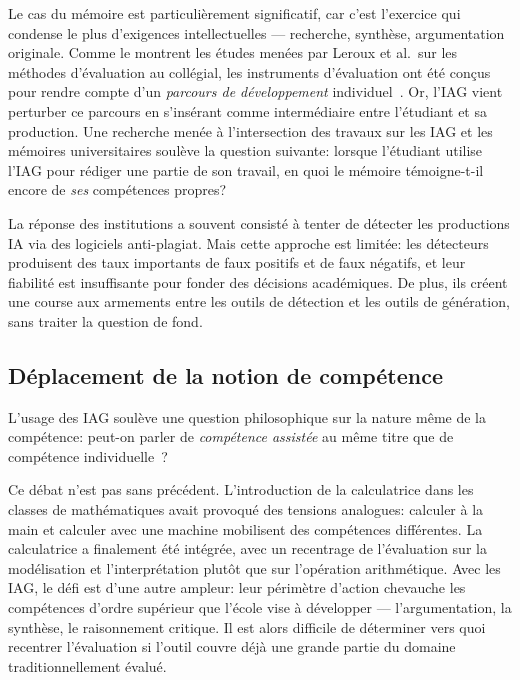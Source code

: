 Le cas du m\'emoire est particuli\`erement significatif, car c'est l'exercice qui condense le plus d'exigences intellectuelles --- recherche, synth\`ese, argumentation originale. 
Comme le montrent les \'etudes men\'ees par Leroux et al.\ sur les m\'ethodes d'\'evaluation au coll\'egial, les instruments d'\'evaluation ont \'et\'e con\c{c}us pour rendre compte d'un \emph{parcours de d\'eveloppement} individuel~\cite{leroux2022}.
Or, l'IAG vient perturber ce parcours en s'ins\'erant comme interm\'ediaire entre l'\'etudiant et sa production. 
Une recherche men\'ee \`a l'intersection des travaux sur les IAG et les m\'emoires universitaires soul\`eve la question suivante: lorsque l'\'etudiant utilise l'IAG pour r\'ediger une partie de son travail, en quoi le m\'emoire t\'emoigne-t-il encore de \emph{ses} comp\'etences propres?

La r\'eponse des institutions a souvent consist\'e \`a tenter de d\'etecter les productions IA via des logiciels anti-plagiat. 
Mais cette approche est limit\'ee: les d\'etecteurs produisent des taux importants de faux positifs et de faux n\'egatifs, et leur fiabilit\'e est insuffisante pour fonder des d\'ecisions acad\'emiques. 
De plus, ils cr\'eent une course aux armements entre les outils de d\'etection et les outils de g\'en\'eration, sans traiter la question de fond.

\subsection{D\'eplacement de la notion de comp\'etence}

L'usage des IAG soul\`eve une question philosophique sur la nature m\^eme de la comp\'etence: peut-on parler de \emph{comp\'etence assist\'ee} au m\^eme titre que de comp\'etence individuelle~?

Ce d\'ebat n'est pas sans pr\'ec\'edent. 
L'introduction de la calculatrice dans les classes de math\'ematiques avait provoqu\'e des tensions analogues: calculer \`a la main et calculer avec une machine mobilisent des comp\'etences diff\'erentes. 
La calculatrice a finalement \'et\'e int\'egr\'ee, avec un recentrage de l'\'evaluation sur la mod\'elisation et l'interpr\'etation plut\^ot que sur l'op\'eration arithm\'etique. 
Avec les IAG, le d\'efi est d'une autre ampleur: leur p\'erim\`etre d'action chevauche les comp\'etences d'ordre sup\'erieur que l'\'ecole vise \`a d\'evelopper --- l'argumentation, la synth\`ese, le raisonnement critique.
Il est alors difficile de déterminer vers quoi recentrer l'\'evaluation si l'outil couvre déjà une grande partie du domaine traditionnellement évalué.


